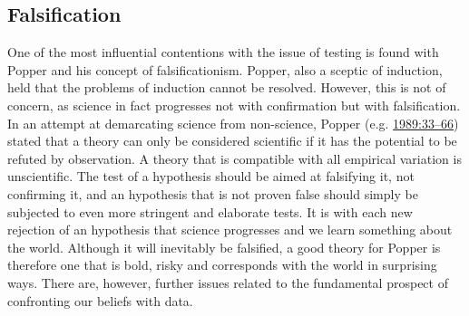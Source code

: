 \documentclass[
  12pt,
  a4paper,
  oneside]{book}
\begin{document}
\hypertarget{falsification}{%
\subsection{Falsification}\label{falsification}}

One of the most influential contentions with the issue of testing is found with Popper and his concept of falsificationism. Popper, also a sceptic of induction, held that the problems of induction cannot be resolved. However, this is not of concern, as science in fact progresses not with confirmation but with falsification. In an attempt at demarcating science from non-science, Popper (e.g. \protect\hyperlink{ref-popper1989}{1989:33--66}) stated that a theory can only be considered scientific if it has the potential to be refuted by observation. A theory that is compatible with all empirical variation is unscientific. The test of a hypothesis should be aimed at falsifying it, not confirming it, and an hypothesis that is not proven false should simply be subjected to even more stringent and elaborate tests. It is with each new rejection of an hypothesis that science progresses and we learn something about the world. Although it will inevitably be falsified, a good theory for Popper is therefore one that is bold, risky and corresponds with the world in surprising ways. There are, however, further issues related to the fundamental prospect of confronting our beliefs with data.
\end{document}
